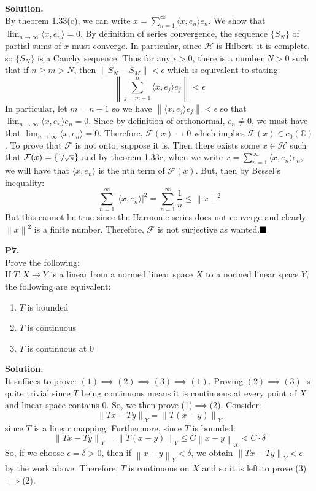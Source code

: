 \documentclass{article}
\newcommand{\norm}[1]{\left\lVert#1\right\rVert}
\begin{document}
    \textbf{Solution.}\\

    By theorem 1.33(c), we can write $x = \sum_{n=1}^{\infty}\langle x,e_n\rangle e_n$. We show that 
    $\lim_{n\to\infty} \langle x,e_n\rangle = 0$. By definition of series convergence, the sequence $\{S_N\}$ of partial sums of $x$
    must converge. In particular, since $\mathcal{H}$ is Hilbert, it is complete, so $\{S_N\}$ is a Cauchy sequence. Thus for any
    $\epsilon>0$, there is a number $N>0$ such that if $n\geq m>N$, then $\norm{S_N-S_M}<\epsilon$ which is equivalent to stating:
    \[ \norm{\sum_{j=m+1}^n \langle x,e_j\rangle e_j} < \epsilon \]
    In particular, let $m=n-1$ so we have $\norm{\langle x,e_j\rangle e_j} < \epsilon$ so that 
    $\lim_{n\to\infty} \langle x,e_n\rangle e_n = 0$. Since by definition of orthonormal, $e_n\neq 0$, we must have that
    $\lim_{n\to\infty} \langle x,e_n\rangle = 0$. Therefore, $\mathcal{F}(x)\to 0$ which implies $\mathcal{F}(x)\in c_0(\mathbb{C})$.
    To prove that $\mathcal{F}$ is not onto, suppose it is. Then there exists some $x\in\mathcal{H}$ such that $\mathcal{F}(x) = 
    \{\nicefrac{1}{\sqrt{n}}\}$ and by theorem 1.33c, when we write $x = \sum_{n=1}^{\infty}\langle x,e_n\rangle e_n$, we will
    have that $\langle x,e_n\rangle$ is the nth term of $\mathcal{F}(x)$. But, then by Bessel's inequality:
    \[ \sum_{n=1}^{\infty} |\langle x,e_n\rangle|^2 = \sum_{n=1}^{\infty} \frac{1}{n} \leq \norm{x}^2 \]
    But this cannot be true since the Harmonic series does not converge and clearly $\norm{x}^2$ is a finite number. Therefore,
    $\mathcal{F}$ is not surjective as wanted.$\hfill\blacksquare$

    \newpage

    \textbf{P7.}\\

    Prove the following:\\
    If $T:X\to Y$ is a linear from a normed linear space $X$ to a normed linear space $Y$, the following are equivalent:
    \begin{enumerate}
        \item $T$ is bounded
        \item $T$ is continuous
        \item $T$ is continuous at 0
    \end{enumerate}

    \textbf{Solution.}\\

    It suffices to prove: $(1)\implies (2)\implies (3)\implies (1)$. Proving $(2)\implies (3)$ is quite trivial since $T$ being
    continuous means it is continuous at every point of $X$ and linear space contains 0. So, we then prove (1)$\implies$(2). Consider:
    \[ \norm{Tx-Ty}_Y = \norm{T(x-y)}_Y \]
    since $T$ is a linear mapping. Furthermore, since $T$ is bounded:
    \[ \norm{Tx-Ty}_Y = \norm{T(x-y)}_Y \leq C\norm{x-y}_X < C\cdot \delta \]
    So, if we choose $\epsilon = \delta > 0$, then if $\norm{x-y}_Y<\delta$, we obtain $\norm{Tx-Ty}_Y<\epsilon$ by the work above.
    Therefore, $T$ is continuous on $X$ and so it is left to prove (3)$\implies$(2).\\
\end{document}
